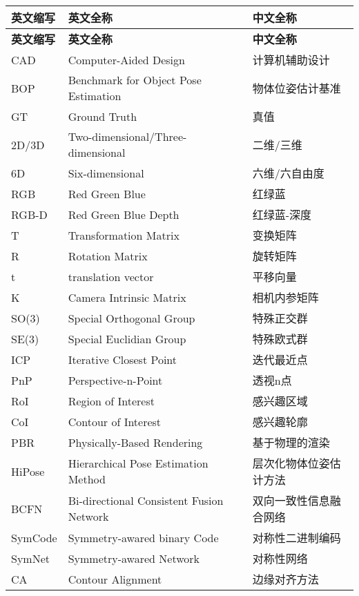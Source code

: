 \cleardoublepage
{}
\begin{center}
    \begin{longtable}{m{2cm}m{8cm}m{5cm}}
        \toprule
        \textbf{英文缩写}&\textbf{英文全称}&\textbf{中文全称}\\
        \midrule
        \endfirsthead
        \toprule
        \textbf{英文缩写}&\textbf{英文全称}&\textbf{中文全称}\\
        \midrule
        \endhead 
        \bottomrule
        \endfoot
        \bottomrule
        \endlastfoot
        CAD&Computer-Aided Design&计算机辅助设计\\
        BOP&Benchmark for Object Pose Estimation&物体位姿估计基准\\
        GT&Ground Truth&真值\\
        2D/3D&Two-dimensional/Three-dimensional&二维/三维\\
        6D&Six-dimensional&六维/六自由度\\
        RGB&Red Green Blue&红绿蓝\\
        RGB-D&Red Green Blue Depth&红绿蓝-深度\\
        T&Transformation Matrix&变换矩阵\\
        R&Rotation Matrix&旋转矩阵\\
        t&translation vector&平移向量\\
        K&Camera Intrinsic Matrix&相机内参矩阵\\
        SO(3)&Special Orthogonal Group&特殊正交群\\
        SE(3)&Special Euclidian Group&特殊欧式群\\
        ICP&Iterative Closest Point&迭代最近点\\
        PnP&Perspective-n-Point&透视n点\\
        RoI&Region of Interest&感兴趣区域\\
        CoI&Contour of Interest&感兴趣轮廓\\
        PBR&Physically-Based Rendering&基于物理的渲染\\
        HiPose& Hierarchical Pose Estimation Method& 层次化物体位姿估计方法\\
        BCFN&Bi-directional Consistent Fusion Network&双向一致性信息融合网络\\
        SymCode&Symmetry-awared binary Code&对称性二进制编码\\
        SymNet&Symmetry-awared Network&对称性网络\\
        CA&Contour Alignment&边缘对齐方法\\
	\end{longtable}
\end{center}